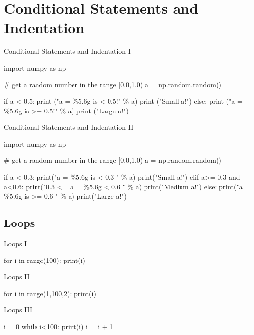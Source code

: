 \documentclass[11pt]{beamer}
\begin{document}
\section{Conditional Statements and Indentation}
\begin{frame}[fragile]{Conditional Statements and Indentation I}
\footnotesize
\begin{semiverbatim}
import numpy as np

# get a random number in the range [0.0,1.0)
a = np.random.random()

if a < 0.5:
    print ("a = \%5.6g is < 0.5!" \% a) 
    print ("Small a!")
else:
    print ("a = \%5.6g is >= 0.5!" \% a) 
    print ("Large a!")
\end{semiverbatim}
\end{frame}

\begin{frame}[fragile]{Conditional Statements and Indentation II}
\footnotesize
\begin{semiverbatim}
import numpy as np

# get a random number in the range [0.0,1.0)
a = np.random.random()

if a < 0.3:
    print("a = \%5.6g is < 0.3 " \% a) 
    print("Small a!")
elif a>= 0.3 and a<0.6:
    print("0.3 <= a = \%5.6g < 0.6 " \% a) 
    print("Medium a!")
else:
    print("a = \%5.6g is >= 0.6 " \% a) 
    print("Large a!")

\end{semiverbatim}
\end{frame}

\subsection{Loops}
\begin{frame}[fragile]{Loops I}
\begin{semiverbatim}
for i in range(100): 
    print(i)

\end{semiverbatim}
\end{frame}

\begin{frame}[fragile]{Loops II}
\begin{semiverbatim}
for i in range(1,100,2): 
    print(i)

\end{semiverbatim}
\end{frame}

\begin{frame}[fragile]{Loops III}
\begin{semiverbatim}
i = 0
while i<100: 
    print(i)
    i = i + 1

\end{semiverbatim}
\end{frame}
\end{document}
